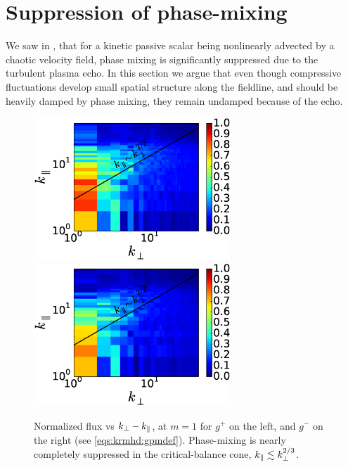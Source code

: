 \section{Suppression of phase-mixing}

    We saw in , that for a kinetic passive scalar being nonlinearly
    advected by a chaotic velocity field, phase mixing is significantly suppressed due to
    the turbulent plasma echo. In this section we argue that even though compressive 
    fluctuations develop small spatial structure along the fieldline, and should be
    heavily damped by phase mixing, they remain undamped because of the echo.     
    \begin{figure}
    \begin{center}
        \includegraphics[width=7.4cm]{figs/slowmodes/sw1_gp_m1_supp_vskpkz.eps}
        \includegraphics[width=7.4cm]{figs/slowmodes/sw1_gm_m1_supp_vskpkz.eps}
        \caption{Normalized flux  vs
        $k_\perp-k_\parallel$, at $m=1$  for $g^+$ on the left, and $g^-$ on the right (see
        \eqref{eqs:krmhd:gpmdef}). Phase-mixing is nearly completely suppressed in the
        critical-balance cone, $k_\parallel \lesssim k_\perp^{2/3}$.}
    \label{slowmodes:fig:supp} 
    \end{center}
    \end{figure}

